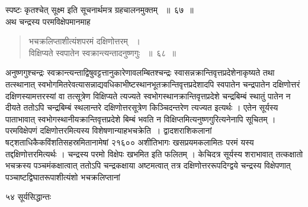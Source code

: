 \documentclass[11pt, openany]{book}
\begin{document}
\begin{sloppypar}
\noindent स्पष्टः कृतश्चेत् सूक्ष्म इति सूचनार्थमत्र ग्रहचालनमुक्तम् ~॥~६७~॥\\
\noindent अथ चन्द्रस्य परमविक्षेपमानमाह\textendash
\end{sloppypar}
\begin{quote}

{\ssi भचक्रलिप्ताशीत्यंशपरमं दक्षिणोत्तरम् ~।\\
विक्षिप्यते स्वपातेन स्वक्रान्त्यन्तादनुष्णगुः ~॥~६८~॥}
\end{quote}
\begin{sloppypar}
अनुष्णगुश्चन्द्रः स्वक्रान्त्यन्ताद्विषुवट्टत्तानुकारेणावलम्बितश्चन्द्रः स्वासन्नक्रान्तिवृत्तप्रदेशेनाकृष्यते तथा तत्स्थानात् स्वभोगमितरेवत्यासन्नाद्यवधिकाभीष्टस्थानभूतक्रान्तिवृत्तप्रदेशादपि स्वपातेन चन्द्रपातेन दक्षिणोत्तरं दक्षिणस्यामत्तरस्यां वा तत्सूत्रेण विक्षिप्यते त्यज्यते स्वभोगस्थानक्रान्तिवृत्तप्रदेशे चन्द्रबिम्बं स्थातुं पातेन न दीयते ततोऽपि चन्द्रबिम्बं स्थलान्तरे दक्षिणोत्तरसूत्रेण किञ्चिदन्तरेण त्यज्यत इत्यर्थः । एतेन सूर्यस्य पाताभावात् स्वभोगस्थानीयक्रान्तिवृत्तप्रदेशे बिम्बं भवति न विक्षिप्तमित्यनुष्णगुरित्यनेनापि सूचितम् । परमविक्षेपणं दक्षिणोत्तरमित्यस्य विशेषणान्याह\textendash भचक्रेति~। द्वादशराशिकलानां षट्शताधिकैकविंशतिसहस्रमितानामेषां २१६०० अशीतिभागः खसप्रयमकलामितः परमं यस्य तद्दक्षिणोत्तरमित्यर्थः । चन्द्रस्य परमो विक्षेपः खभमित इति फलितम् । केचिदत्र सूर्यस्य शराभावात् तत्कक्षातो भचक्रस्य पञ्चमंकक्षात्वात् ततोऽपि चन्द्रकक्षाया अष्टमत्वात् तत्र दक्षिणोत्तररूपदिग्द्वये चन्द्रस्य विक्षेपणात् पञ्चाष्टद्विघातरूपाशीत्यंशो भचक्रलिप्तानां
\end{sloppypar}

\newpage

\noindent ५४ \hspace{4cm} सूर्यसिद्धान्तः
\vspace{1cm}
\end{document}
